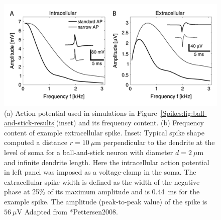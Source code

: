 \begin{figure}[!ht]
\begin{center}
\includegraphics{Figures/Spikes/Spikes-ball-and-stick-frequency-w90-r150}
\end{center}
\caption[]{(a) Action potential used in simulations in Figure~\ref{Spikes:fig:ball-and-stick-results}(inset) 
and its frequency content.
(b) Frequency content of example extracellular spike.
Inset: Typical spike shape computed a distance $r=10~\mu$m
perpendicular to the dendrite at the level of soma for a ball-and-stick 
neuron with diameter $d=2~\mu$m and infinite dendrite length.
Here the intracellular action potential in left panel was imposed as a voltage-clamp in the soma.
The extracellular spike width is defined as the width of the negative phase at 25\% of its maximum
amplitude and is 0.44~ms for the example spike.
The amplitude (peak-to-peak value) of the spike is $56~\mu$V  
Adapted from \citeasnoun**{Pettersen2008}.}
\label{Spikes:fig:ball-and-stick-frequency}
\end{figure}

%

